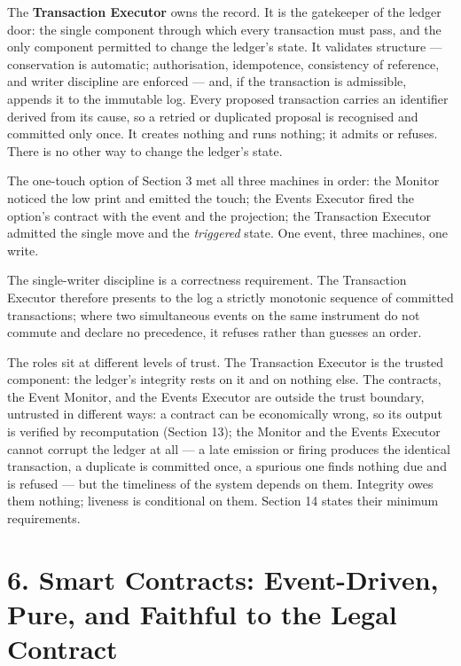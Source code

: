 \documentclass[11pt,a4paper]{article}
\begin{document}
The \textbf{Transaction Executor} owns the record. It is the gatekeeper
of the ledger door: the single component through which every transaction
must pass, and the only component permitted to change the ledger's
state. It validates structure --- conservation is automatic;
authorisation, idempotence, consistency of reference, and writer
discipline are enforced --- and, if the transaction is admissible,
appends it to the immutable log. Every proposed transaction carries an
identifier derived from its cause, so a retried or duplicated proposal
is recognised and committed only once. It creates nothing and runs
nothing; it admits or refuses. There is no other way to change the
ledger's state.

The one-touch option of Section 3 met all three machines in order: the
Monitor noticed the low print and emitted the touch; the Events Executor
fired the option's contract with the event and the projection; the
Transaction Executor admitted the single move and the \emph{triggered}
state. One event, three machines, one write.

The single-writer discipline is a correctness requirement. The
Transaction Executor therefore presents to the log a strictly monotonic
sequence of committed transactions; where two simultaneous events on the
same instrument do not commute and declare no precedence, it refuses
rather than guesses an order.

The roles sit at different levels of trust. The Transaction Executor is
the trusted component: the ledger's integrity rests on it and on nothing
else. The contracts, the Event Monitor, and the Events Executor are
outside the trust boundary, untrusted in different ways: a contract can
be economically wrong, so its output is verified by recomputation
(Section 13); the Monitor and the Events Executor cannot corrupt the
ledger at all --- a late emission or firing produces the identical
transaction, a duplicate is committed once, a spurious one finds nothing
due and is refused --- but the timeliness of the system depends on them.
Integrity owes them nothing; liveness is conditional on them. Section 14
states their minimum requirements.

\hypertarget{smart-contracts-event-driven-pure-and-faithful-to-the-legal-contract}{%
\section{6. Smart Contracts: Event-Driven, Pure, and Faithful to the
Legal
Contract}\label{smart-contracts-event-driven-pure-and-faithful-to-the-legal-contract}}
\end{document}
